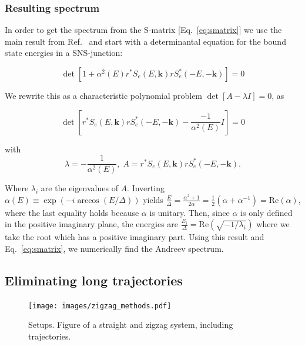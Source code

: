 		\subsubsection{Resulting spectrum}
			In order to get the spectrum from the S-matrix [Eq.~\eqref{eq:smatrix}] we use the main result from Ref.~\cite{beenakker1991universal} and start with a determinantal equation for the bound state energies in a SNS-junction:

			\begin{equation}
			\det\left[1+\alpha^{2}\left(E\right)r^{*}S_{e}\left(E,\bm{k}\right)rS_{e}^{*}\left(-E,-\bm{k}\right)\right]=0
			\end{equation}

			We rewrite this as a characteristic polynomial problem $\det\left[A-\lambda I\right]=0$, as

			\begin{equation}
			\det\left[r^{*}S_{e}\left(E,\bm{k}\right)rS_{e}^{*}\left(-E,-\bm{k}\right)-\frac{-1}{\alpha^{2}\left(E\right)}I\right]=0
			\end{equation}

			with
			\begin{equation}
			\lambda=-\frac{1}{\alpha^{2}\left(E\right)},\;A=r^{*}S_{e}\left(E,\bm{k}\right)rS_{e}^{*}\left(-E,-\bm{k}\right).
			\end{equation}

			Where $\lambda_i$ are the eigenvalues of $A$.
			Inverting $\alpha\left(E\right)\equiv\exp\left(-i\arccos\left(E/\Delta\right)\right)$ yields $\frac{E}{\Delta}=\frac{\alpha^{2}+1}{2\alpha}=\frac{1}{2}\left(\alpha+\alpha^{-1}\right)=\textrm{Re}(\alpha)$, where the last equality holds because $\alpha$ is unitary.
			Then, since $\alpha$ is only defined in the positive imaginary plane, the energies are $\frac{E_{i}}{\Delta}=\textrm{Re}\left(\sqrt{-1/\lambda_{i}}\right)$ where we take the root which has a positive imaginary part.
			Using this result and Eq.~\eqref{eq:smatrix}, we numerically find the Andreev spectrum.

	\subsection{Eliminating long trajectories}

		\begin{figure}[!htb]
		\centering
		\texttt{[image: images/zigzag\_methods.pdf]}
		\caption{Setups. Figure of a straight and zigzag system, including trajectories.
		\label{fig:setup}}
		\end{figure}

